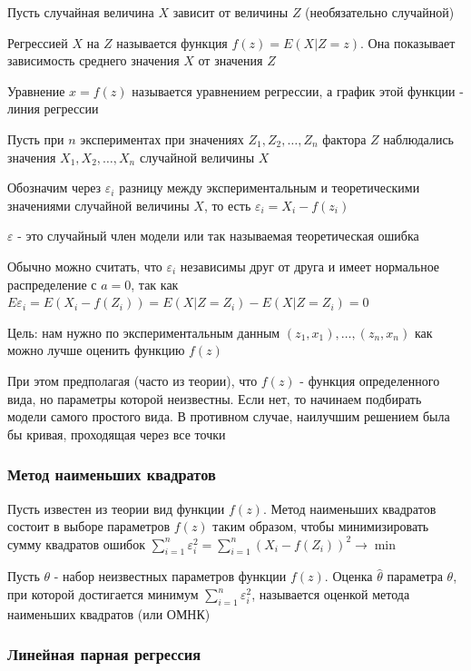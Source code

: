 \documentclass[12pt]{article}
\begin{document}
\hypertarget{regression}{}

Пусть случайная величина $X$ зависит от величины $Z$ (необязательно случайной)

\Def Регрессией $X$ на $Z$ называется функция $f(z) = E(X|Z = z)$. 
Она показывает зависимость среднего значения $X$ от значения $Z$

Уравнение $x = f(z)$ называется уравнением регрессии, а график этой функции - линия регрессии

Пусть при $n$ экспериментах при значениях $Z_1, Z_2, \dots, Z_n$ фактора $Z$ наблюдались значения
$X_1, X_2, \dots, X_n$ случайной величины $X$

Обозначим через $\varepsilon_i$ разницу между экспериментальным и теоретическими значениями случайной величины $X$,
то есть $\varepsilon_i = X_i - f(z_i)$

$\varepsilon$ - это случайный член модели или так называемая теоретическая ошибка

\Nota Обычно можно считать, что $\varepsilon_i$ независимы друг от друга и имеет нормальное распределение с $a = 0$,
так как $E\varepsilon_i = E(X_i - f(Z_i)) = E(X | Z = Z_i) - E(X | Z = Z_i) = 0$

Цель: нам нужно по экспериментальным данным $(z_1, x_1), \dots, (z_n, x_n)$ как можно лучше оценить функцию $f(z)$

\Notas При этом предполагая (часто из теории), что $f(z)$ - функция определенного вида, но параметры которой неизвестны.
Если нет, то начинаем подбирать модели самого простого вида. В противном случае, наилучшим решением была бы кривая, 
проходящая через все точки 

\subsubsection{Метод наименьших квадратов}

\hypertarget{method_of_least_squares}{}

Пусть известен из теории вид функции $f(z)$. Метод наименьших квадратов состоит в выборе параметров $f(z)$ таким образом,
чтобы минимизировать сумму квадратов ошибок $\sum_{i = 1}^n \varepsilon_i^2 = \sum_{i = 1}^n (X_i - f(Z_i))^2 \rightarrow \min$

\Def Пусть $\theta$ - набор неизвестных параметров функции $f(z)$. Оценка $\hat \theta$ параметра $\theta$, 
при которой достигается минимум $\sum_{i = 1}^n \varepsilon_i^2$, называется оценкой метода наименьших квадратов (или ОМНК)

\subsubsection{Линейная парная регрессия}
\end{document}
